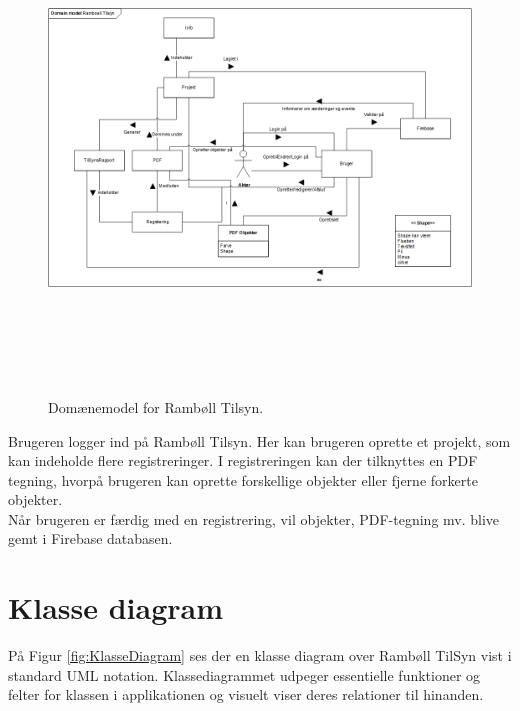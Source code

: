 \begin{figure}[H] %
	\centering
	\includegraphics[height=13cm, width=17cm]{../ArkitekturDesign/OverordnetArkitektur/Domainmodel}
	\caption{Domænemodel for Rambøll Tilsyn.}
	\label{fig:Domain}
\end{figure}
Brugeren logger ind på Rambøll Tilsyn. Her kan brugeren oprette et projekt, som kan indeholde flere registreringer. I registreringen kan der tilknyttes en PDF tegning, hvorpå brugeren kan oprette forskellige objekter eller fjerne forkerte objekter. \\
Når brugeren er færdig med en registrering, vil objekter, PDF-tegning mv. blive gemt i Firebase databasen.

\clearpage

\section{Klasse diagram}
På Figur \ref{fig:KlasseDiagram} ses der en klasse diagram over Rambøll TilSyn vist i standard UML notation\cite{UML}. Klassediagrammet udpeger essentielle funktioner og felter for klassen i applikationen og visuelt viser deres relationer til hinanden.

